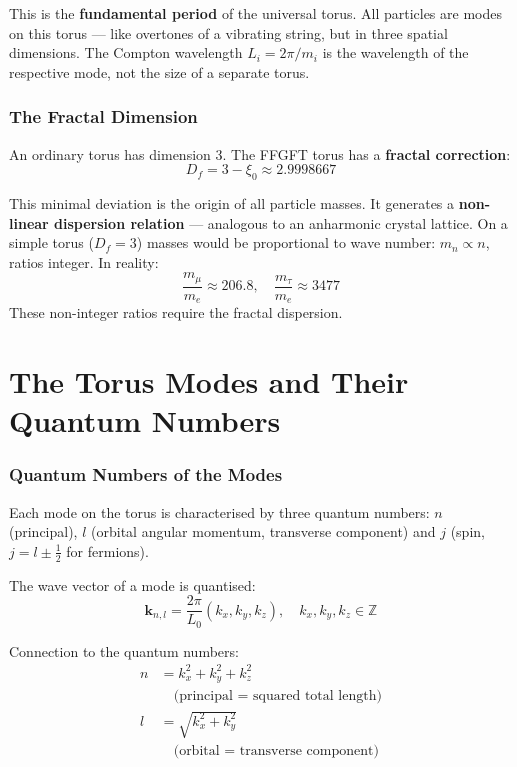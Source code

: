 This is the \textbf{fundamental period} of the universal torus.
All particles are modes on this torus — like overtones of a vibrating
string, but in three spatial dimensions. The Compton wavelength
$L_i = 2\pi/m_i$ is the wavelength of the respective mode,
not the size of a separate torus.

\section{The Fractal Dimension}

An ordinary torus has dimension 3. The FFGFT torus has a
\textbf{fractal correction}:
\begin{equation}
  D_f = 3 - \xi_0 \approx 2.9998667
\end{equation}

This minimal deviation is the origin of all particle masses.
It generates a \textbf{non-linear dispersion relation} — analogous
to an anharmonic crystal lattice. On a simple torus ($D_f = 3$)
masses would be proportional to wave number: $m_n \propto n$,
ratios integer. In reality:
\[
  \frac{m_\mu}{m_e} \approx 206.8, \quad
  \frac{m_\tau}{m_e} \approx 3477
\]
These non-integer ratios require the fractal dispersion.

\part{The Torus Modes and Their Quantum Numbers}

\section{Quantum Numbers of the Modes}

Each mode on the torus is characterised by three quantum numbers:
$n$ (principal), $l$ (orbital angular momentum, transverse component)
and $j$ (spin, $j = l \pm \tfrac{1}{2}$ for fermions).

The wave vector of a mode is quantised:
\begin{equation}
  \mathbf{k}_{n,l} = \frac{2\pi}{L_0}(k_x, k_y, k_z),
  \quad k_x, k_y, k_z \in \mathbb{Z}
\end{equation}

Connection to the quantum numbers:
\begin{align}
  n &= k_x^2 + k_y^2 + k_z^2 \\
  &\quad\text{(principal = squared total length)} \nonumber \\
  l &= \sqrt{k_x^2 + k_y^2} \\
  &\quad\text{(orbital = transverse component)} \nonumber
\end{align}

